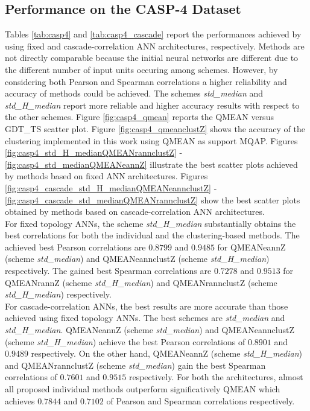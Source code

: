 \subsection{Performance on the CASP-4 Dataset}
\label{subsec:performance_on_the_casp4_dataset}
Tables \ref{tab:casp4} and \ref{tab:casp4_cascade} report the performances achieved by using fixed and ca\-sca\-de-\-cor\-re\-la\-tion ANN architectures, respectively. Methods are not directly comparable because the initial neural networks are different due to the different number of input units occuring among schemes. However, by considering both Pearson and Spearman correlations a higher reliability and accuracy of methods could be achieved. The schemes \emph{std\_median} and \emph{std\_H\_median} report more reliable and higher accuracy results with respect to the other schemes. Figure \ref{fig:casp4_qmean} reports the QMEAN versus GDT\_TS scatter plot. Figure \ref{fig:casp4_qmeanclustZ} shows the accuracy of the clustering implemented in this work using QMEAN as support MQAP. Figures \ref{fig:casp4_std_H_medianQMEANrannclustZ} - \ref{fig:casp4_std_medianQMEANeannZ} illustrate the best scatter plots achieved by methods based on fixed ANN architectures. Figures \ref{fig:casp4_cascade_std_H_medianQMEANeannclustZ} - \ref{fig:casp4_cascade_std_medianQMEANrannclustZ} show the best scatter plots obtained by methods based on ca\-sca\-de-\-cor\-re\-la\-tion ANN architectures. \\
For fixed topology ANNs, the scheme \emph{std\_H\_median} substantially obtains the best correlations for both the individual and the clustering-based methods. The achieved best Pearson correlations are $0.8799$ and $0.9485$ for QMEANeannZ (scheme \emph{std\_median}) and QMEANeannclustZ (scheme \emph{std\_H\_median}) respectively. The gained best Spearman correlations are $0.7278$ and $0.9513$ for QMEANrannZ (scheme \emph{std\_H\_median}) and QMEANrannclustZ (scheme \emph{std\_H\_median}) respectively.\\
For ca\-sca\-de-\-cor\-re\-la\-tion ANNs, the best results are more accurate than those achieved using fixed topology ANNs. The best schemes are \emph{std\_median} and \emph{std\_H\_median}. QMEANeannZ (scheme \emph{std\_median}) and QMEANeannclustZ (scheme \emph{std\_H\_median}) achieve the best Pearson correlations of $0.8901$ and $0.9489$ respectively. On the other hand, QMEANeannZ (scheme \emph{std\_H\_median}) and QMEANrannclustZ (scheme \emph{std\_median}) gain the best Spearman correlations of $0.7601$ and $0.9515$ respectively. 
For both the architectures, almost all proposed individual methods outperform significatively QMEAN which achieves $0.7844$ and $0.7102$ of Pearson and Spearman correlations respectively.



